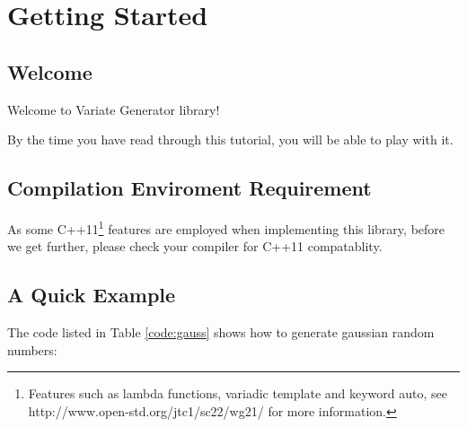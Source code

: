 \section{Getting Started}

\subsection{Welcome}

Welcome to Variate Generator library! 

By the time you have read through this tutorial, you will be able to play with it.

\subsection{Compilation Enviroment Requirement}

As some C++11\footnote{Features such as lambda functions, variadic template and keyword auto, see http://www.open-std.org/jtc1/sc22/wg21/ for more information.} features are employed when implementing this library, 
before we get further, please check your compiler for C++11 compatablity.

\subsection{A Quick Example}

The code listed in Table \ref{code:gauss} shows how to generate gaussian random numbers:

